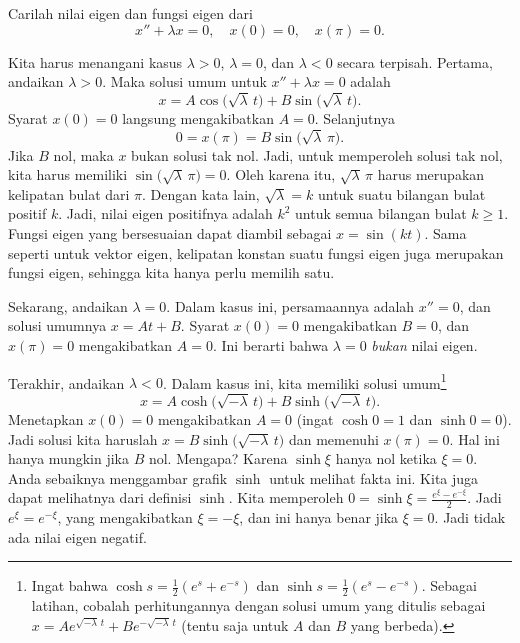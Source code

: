 \begin{example} \label{bvp:eig1ex}
Carilah nilai eigen dan fungsi eigen dari
\begin{equation*}
x'' + \lambda x = 0, \quad x(0) = 0, \quad x(\pi) = 0 .
\end{equation*}

Kita harus menangani
kasus $\lambda > 0$, $\lambda = 0$, dan $\lambda < 0$ secara terpisah.
Pertama, andaikan $\lambda > 0$.  Maka
solusi umum untuk $x''+\lambda x = 0$ adalah
\begin{equation*}
x = A \cos \bigl( \sqrt{\lambda}\, t\bigr)
+ B \sin \bigl( \sqrt{\lambda}\, t\bigr).
\end{equation*}
Syarat $x(0) = 0$ langsung mengakibatkan $A = 0$.
Selanjutnya
\begin{equation*}
0 = x(\pi) = B \sin \bigl( \sqrt{\lambda}\, \pi \bigr) .
\end{equation*}
Jika $B$ nol, maka $x$ bukan solusi tak nol.  Jadi, untuk memperoleh solusi
tak nol, kita harus memiliki $\sin \bigl( \sqrt{\lambda}\, \pi\bigr) = 0$.  Oleh karena itu,
$\sqrt{\lambda}\, \pi$ harus merupakan kelipatan bulat dari $\pi$.
Dengan kata lain, $\sqrt{\lambda} = k$ untuk suatu bilangan bulat positif $k$.
Jadi, nilai eigen positifnya adalah
$k^2$ untuk semua bilangan bulat $k \geq 1$.  Fungsi eigen yang bersesuaian
dapat diambil sebagai $x=\sin (k t)$.  Sama seperti untuk vektor eigen, kelipatan
konstan suatu fungsi eigen juga merupakan fungsi eigen,
sehingga kita hanya perlu memilih satu.

Sekarang, andaikan $\lambda = 0$.  Dalam kasus ini, persamaannya adalah $x'' = 0$,
dan solusi umumnya $x = At + B$.  Syarat $x(0) = 0$ mengakibatkan
$B=0$, dan $x(\pi) = 0$ mengakibatkan $A = 0$.  Ini berarti bahwa $\lambda
= 0$ \emph{bukan} nilai eigen.

Terakhir, andaikan $\lambda < 0$.  Dalam kasus ini, kita memiliki solusi
umum\footnote{Ingat bahwa
$\cosh s = \frac{1}{2}(e^s+e^{-s})$
dan
$\sinh s = \frac{1}{2}(e^s-e^{-s})$.  Sebagai latihan,
cobalah perhitungannya dengan solusi umum yang ditulis sebagai
$x = A e^{\sqrt{-\lambda}\, t} + B e^{-\sqrt{-\lambda}\, t}$ (tentu saja untuk
$A$ dan $B$ yang berbeda).}
\begin{equation*}
x = A \cosh \bigl( \sqrt{-\lambda}\, t\bigr)
+ B \sinh \bigl( \sqrt{-\lambda}\, t \bigr) .
\end{equation*}
Menetapkan $x(0) = 0$ mengakibatkan $A = 0$ (ingat $\cosh 0 = 1$ dan $\sinh 0 =
0$).  Jadi solusi kita haruslah $x = B \sinh \bigl( \sqrt{-\lambda}\, t \bigr)$ dan memenuhi
$x(\pi) = 0$.  Hal ini hanya mungkin jika $B$ nol.  Mengapa?  Karena
$\sinh \xi$ hanya nol ketika $\xi=0$.  Anda sebaiknya menggambar grafik $\sinh$ untuk melihat
fakta ini.
Kita juga dapat melihatnya dari definisi $\sinh$.
Kita memperoleh $0 = \sinh \xi = \frac{e^\xi -
e^{-\xi}}{2}$.  Jadi $e^\xi = e^{-\xi}$, yang mengakibatkan $\xi = -\xi$, dan ini hanya
benar jika $\xi=0$.  Jadi tidak ada nilai eigen negatif.


\end{example}
